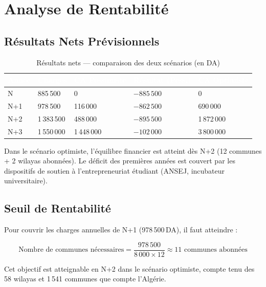 \documentclass[12pt,a4paper]{report}
\newcommand{\thdcell}[1]{%
  \cellcolor{tabhead}\textbf{\textcolor{white}{#1}}%
}
\begin{document}
\section{Analyse de Rentabilité}

\subsection{Résultats Nets Prévisionnels}

\begin{table}[H]
  \centering
  \caption{Résultats nets — comparaison des deux scénarios (en DA)}
  \renewcommand{\arraystretch}{1.4}
  \begin{tabularx}{\linewidth}{lXXXX}
    \toprule
    \rowcolor{primary}
    \thdcell{Année} & \thdcell{Charges} & \thdcell{CA Pessimiste} &
    \thdcell{Résultat (Pess.)} & \thdcell{CA Optimiste} \\
    \midrule

    N   & 885\,500   & 0         & $-885\,500$ & 0           \\
    \rowcolor{lightgray}
    N+1 & 978\,500   & 116\,000  & $-862\,500$ & 690\,000    \\
    N+2 & 1\,383\,500 & 488\,000 & $-895\,500$ & 1\,872\,000 \\
    N+3 & 1\,550\,000 & 1\,448\,000 & $-102\,000$ & 3\,800\,000 \\

    \bottomrule
  \end{tabularx}
\end{table}

\begin{notebox}
  Dans le scénario optimiste, l'équilibre financier est atteint dès N+2
  (12 communes + 2 wilayas abonnées). Le déficit des premières années est
  couvert par les dispositifs de soutien à l'entrepreneuriat étudiant (ANSEJ,
  incubateur universitaire).
\end{notebox}

\subsection{Seuil de Rentabilité}

Pour couvrir les charges annuelles de N+1 (978\,500\,DA), il faut atteindre :

\[
  \text{Nombre de communes nécessaires} =
  \frac{978\,500}{8\,000 \times 12} \approx 11 \text{ communes abonnées}
\]

Cet objectif est atteignable en N+2 dans le scénario optimiste, compte tenu
des 58 wilayas et 1\,541 communes que compte l'Algérie.
\end{document}
